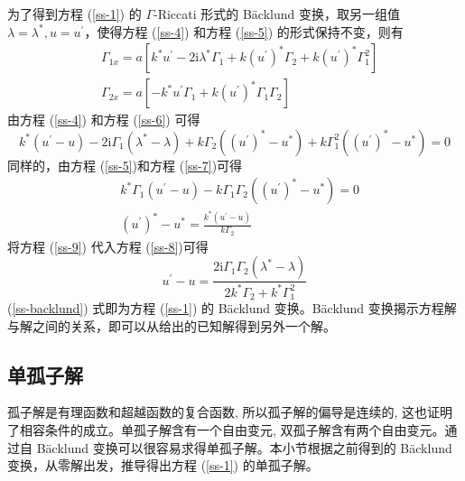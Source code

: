 为了得到方程 (\ref{ss-1}) 的 $\Gamma$-Riccati 形式的 B\"acklund 变换，取另一组值 $\lambda = \lambda^{*}, u = u^{'}$，使得方程 (\ref{ss-4}) 和方程 (\ref{ss-5}) 的形式保持不变，则有
\begin{align}
  & \Gamma_{1x} = a\left[k^{*}u^{'} - 2\mathrm{i}\lambda^{*}\Gamma_{1} + k(u^{'})^{*}\Gamma_{2} + k(u^{'})^{*}\Gamma_{1}^{2}\right] \label{ss-6} \\
  & \Gamma_{2x} = a\left[-k^{*}u^{'}\Gamma_{1} + k(u^{'})^{*}\Gamma_{1}\Gamma_{2}\right] \label{ss-7}
\end{align}
由方程 (\ref{ss-4}) 和方程 (\ref{ss-6}) 可得
\begin{equation}
  k^{*}(u^{'}-u) - 2\mathrm{i}\Gamma_{1}(\lambda^{*}-\lambda) + k\Gamma_{2}((u^{'})^{*}-u^{*}) + k\Gamma_{1}^{2}((u^{'})^{*}-u^{*}) = 0 \label{ss-8}
\end{equation}
同样的，由方程 (\ref{ss-5})和方程 (\ref{ss-7})可得
\begin{align}
  & k^{*}\Gamma_{1}(u^{'}-u) - k\Gamma_{1}\Gamma_{2}((u^{'})^{*}-u^{*}) = 0 \\
  & (u^{'})^{*} - u^{*} = \frac{k^{*}(u^{'}-u)}{k\Gamma_{2}} \label{ss-9}
\end{align}
将方程 (\ref{ss-9}) 代入方程 (\ref{ss-8})可得
\begin{equation}
  u^{'} - u = \frac{2\mathrm{i}\Gamma_{1}\Gamma_{2}(\lambda^{*}-\lambda)}{2k^{*}\Gamma_{2} + k^{*}\Gamma_{1}^{2}} \label{ss-backlund}
\end{equation}
(\ref{ss-backlund}) 式即为方程 (\ref{ss-1}) 的 B\"acklund 变换。B\"acklund 变换揭示方程解与解之间的关系，即可以从给出的已知解得到另外一个解。

\subsection{单孤子解}
孤子解是有理函数和超越函数的复合函数, 所以孤子解的偏导是连续的, 这也证明了相容条件的成立。单孤子解含有一个自由变元, 双孤子解含有两个自由变元。通过自 B\"{a}cklund 变换可以很容易求得单孤子解。本小节根据之前得到的 B\"acklund 变换，从零解出发，推导得出方程 (\ref{ss-1}) 的单孤子解。

